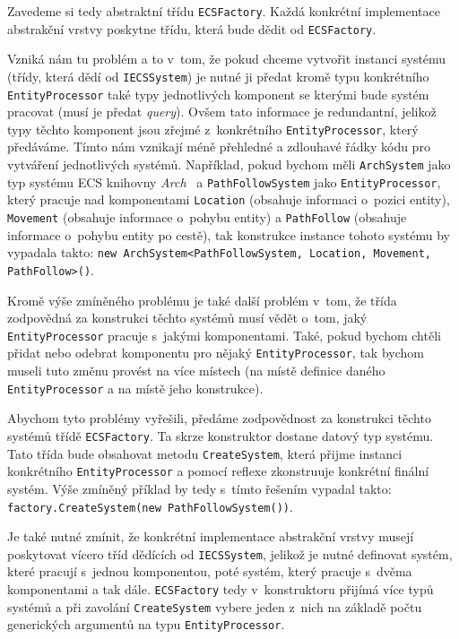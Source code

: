Zavedeme si tedy abstraktní třídu \verb|ECSFactory|. Každá konkrétní implementace abstrakční vrstvy poskytne třídu, která bude dědit od \verb|ECSFactory|.

Vzniká nám tu problém a to v~tom, že pokud chceme vytvořit instanci systému (třídy, která dědí od \verb|IECSSystem|) je nutné ji předat kromě typu konkrétního \verb|EntityProcessor| také typy jednotlivých komponent se kterými bude systém pracovat (musí je předat \textit{query}). Ovšem tato informace je redundantní, jelikož typy těchto komponent jsou zřejmé z~konkrétního \verb|EntityProcessor|, který předáváme. Tímto nám vznikají méně přehledné a zdlouhavé řádky kódu pro vytváření jednotlivých systémů. Například, pokud bychom měli \verb|ArchSystem| jako typ systému ECS knihovny \textit{Arch}~\cite{Arch} a \verb|PathFollowSystem| jako \verb|EntityProcessor|, který pracuje nad komponentami \verb|Location| (obsahuje informaci o~pozici entity), \verb|Movement| (obsahuje informace o~pohybu entity) a \verb|PathFollow| (obsahuje informace o~pohybu entity po cestě), tak konstrukce instance tohoto systému by vypadala takto: \texttt{new ArchSystem<PathFollowSystem, Location, Movement, PathFollow>()}.

Kromě výše zmíněného problému je také další problém v~tom, že třída zodpovědná za konstrukci těchto systémů musí vědět o~tom, jaký \verb|EntityProcessor| pracuje s~jakými komponentami. Také, pokud bychom chtěli přidat nebo odebrat komponentu pro nějaký \verb|EntityProcessor|, tak bychom museli tuto změnu provést na více místech (na místě definice daného \verb|EntityProcessor| a na místě jeho konstrukce).

Abychom tyto problémy vyřešili, předáme zodpovědnost za konstrukci těchto systémů třídě \verb|ECSFactory|. Ta skrze konstruktor dostane datový typ systému. Tato třída bude obsahovat metodu \verb|CreateSystem|, která přijme instanci konkrétního \verb|EntityProcessor| a pomocí reflexe zkonstruuje konkrétní finální systém. Výše zmíněný příklad by tedy s~tímto řešením vypadal takto: \verb|factory.CreateSystem(new PathFollowSystem())|.

Je také nutné zmínit, že konkrétní implementace abstrakční vrstvy musejí poskytovat vícero tříd dědících od \verb|IECSSystem|, jelikož je nutné definovat systém, které pracují s~jednou komponentou, poté systém, který pracuje s~dvěma komponentami a tak dále. \verb|ECSFactory| tedy v~konstruktoru přijímá více typů systémů a při zavolání \verb|CreateSystem| vybere jeden z~nich na základě počtu generických argumentů na typu \verb|EntityProcessor|.

